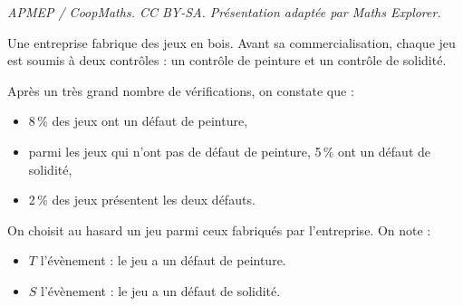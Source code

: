 \documentclass[10pt]{article}
\begin{document}
\noindent\textit{APMEP / CoopMaths. CC BY-SA. Présentation adaptée par Maths Explorer.}\par\medskip
\medskip

Une entreprise fabrique des jeux en bois. Avant sa commercialisation, chaque jeu est soumis
à deux contrôles : un contrôle de peinture et un contrôle de solidité.

Après un très grand nombre de vérifications, on constate que :

\begin{itemize}
\item  8\,\% des jeux ont un défaut de peinture,
\item parmi les jeux qui n'ont pas de défaut de peinture, 5\,\% ont un défaut de solidité,
\item 2\,\% des jeux présentent les deux défauts.
\end{itemize}
On choisit au hasard un jeu parmi ceux fabriqués par l'entreprise. On note :
\begin{itemize}
\item $T$ l'évènement : \og le jeu a un défaut de peinture. \fg
\item $S$ l'évènement : \og le jeu a un défaut de solidité. \fg
\end{itemize}

\medskip
\end{document}
